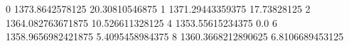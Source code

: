 0 1373.8642578125 20.30810546875
1 1371.29443359375 17.73828125
2 1364.082763671875 10.526611328125
4 1353.55615234375 0.0
6 1358.9656982421875 5.4095458984375
8 1360.3668212890625 6.8106689453125
